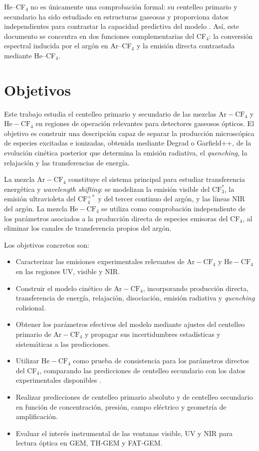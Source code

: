 \documentclass[12pt,a4paper]{article}
\newcommand{\He}{\mathrm{He}}
\newcommand{\Ar}{\mathrm{Ar}}
\newcommand{\CF}{\mathrm{CF}}
\begin{document}
He--CF$_4$ no es únicamente una comprobación formal: su centelleo primario y secundario ha sido estudiado en estructuras gaseosas y proporciona datos independientes para contrastar la capacidad predictiva del modelo \cite{fraga2003the,FlorianPrimarySecundary}. Así, este documento se concentra en dos funciones complementarias del CF$_4$: la conversión espectral inducida por el argón en Ar--CF$_4$ y la emisión directa contrastada mediante He--CF$_4$.


\section{Objetivos}

Este trabajo estudia el centelleo primario y secundario de las mezclas $\Ar-\CF_4$ y $\He-\CF_4$ en regiones de operación relevantes para detectores gaseosos ópticos. El objetivo es construir una descripción capaz de separar la producción microscópica de especies excitadas e ionizadas, obtenida mediante Degrad o Garfield++, de la evolución cinética posterior que determina la emisión radiativa, el \emph{quenching}, la relajación y las transferencias de energía.

La mezcla $\Ar-\CF_4$ constituye el sistema principal para estudiar transferencia energética y \emph{wavelength shifting}: se modelizan la emisión visible del $\CF_3^*$, la emisión ultravioleta del $\CF_4^{+*}$ y del tercer continuo del argón, y las líneas NIR del argón. La mezcla $\He-\CF_4$ se utiliza como comprobación independiente de los parámetros asociados a la producción directa de especies emisoras del CF$_4$, al eliminar los canales de transferencia propios del argón.

Los objetivos concretos son:
\begin{itemize}
    \item Caracterizar las emisiones experimentales relevantes de $\Ar-\CF_4$ y $\He-\CF_4$ en las regiones UV, visible y NIR.
    \item Construir el modelo cinético de $\Ar-\CF_4$, incorporando producción directa, transferencia de energía, relajación, disociación, emisión radiativa y \emph{quenching} colisional.
    \item Obtener los parámetros efectivos del modelo mediante ajustes del centelleo primario de $\Ar-\CF_4$ y propagar sus incertidumbres estadísticas y sistemáticas a las predicciones.
    \item Utilizar $\He-\CF_4$ como prueba de consistencia para los parámetros directos del CF$_4$, comparando las predicciones de centelleo secundario con los datos experimentales disponibles \cite{fraga2003the,FlorianPrimarySecundary}.
    \item Realizar predicciones de centelleo primario absoluto y de centelleo secundario en función de concentración, presión, campo eléctrico y geometría de amplificación.
    \item Evaluar el interés instrumental de las ventanas visible, UV y NIR para lectura óptica en GEM, TH-GEM y FAT-GEM.
\end{itemize}
\end{document}
